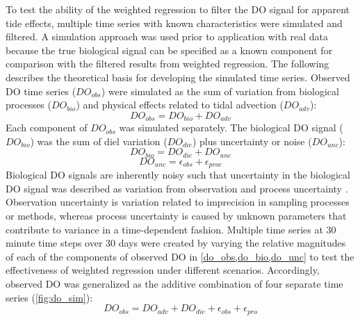 \documentclass[letterpaper,12pt,oneside]{article}\usepackage[]{graphicx}\usepackage[]{color}
\begin{document}
To test the ability of the weighted regression to filter the \ac{DO} signal for apparent tide effects, multiple time series with known characteristics were simulated and filtered.  A simulation approach was used prior to application with real data because the true biological signal can be specified as a known component for comparison with the filtered results from weighted regression. The following describes the theoretical basis for developing the simulated time series.  Observed \ac{DO} time series ($DO_{obs}$) were simulated as the sum of variation from biological processes ($DO_{bio}$) and physical effects related to tidal advection ($DO_{adv}$):  
\begin{equation} \label{do_obs}
DO_{obs} = DO_{bio} + DO_{adv}
\end{equation}
Each component of $DO_{obs}$ was simulated separately.  The biological \ac{DO} signal ($DO_{bio}$) was the sum of diel variation ($DO_{die}$) plus uncertainty or noise ($DO_{unc}$):
\begin{equation} \label{do_bio} 
DO_{bio} = DO_{die} + DO_{unc}
\end{equation} 
\begin{equation} \label{do_unc}
DO_{unc} = \epsilon_{obs} + \epsilon_{proc}
\end{equation}
Biological \ac{DO} signals are inherently noisy \citep{Batt12} such that uncertainty in the biological \ac{DO} signal was described as variation from observation and process uncertainty \citep[$\epsilon_{obs}$ and $\epsilon_{pro}$,][]{Hilborn97}. Observation uncertainty is variation related to imprecision in sampling processes or methods, whereas process uncertainty is caused by unknown parameters that contribute to variance in a time-dependent fashion.  Multiple time series at 30 minute time steps over 30 days were created by varying the relative magnitudes of each of the components of observed \ac{DO} in \cref{do_obs,do_bio,do_unc} to test the effectiveness of weighted regression under different scenarios.  Accordingly, observed \ac{DO} was generalized as the additive combination of four separate time series (\cref{fig:do_sim}):
\begin{equation} \label{do_obs_all}
DO_{obs} = DO_{adv} + DO_{die} + \epsilon_{obs} + \epsilon_{pro}
\end{equation} 
\end{document}
